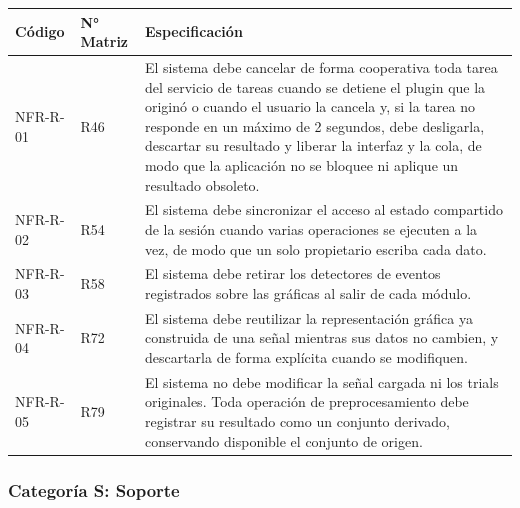 \documentclass[12pt, letterpaper]{article}
\begin{document}
\begin{longtable}{|p{2.5cm}|p{2.5cm}|p{10.1cm}|}
\hline
\rowcolor{gray!25}
\textbf{Código} & \textbf{N° Matriz} & \textbf{Especificación} \\
\hline
\endhead

\hline
\endlastfoot

NFR-R-01 & R46 & El sistema debe cancelar de forma cooperativa toda tarea del servicio de tareas cuando se detiene el plugin que la originó o cuando el usuario la cancela y, si la tarea no responde en un máximo de 2 segundos, debe desligarla, descartar su resultado y liberar la interfaz y la cola, de modo que la aplicación no se bloquee ni aplique un resultado obsoleto. \\
\hline
NFR-R-02 & R54 & El sistema debe sincronizar el acceso al estado compartido de la sesión cuando varias operaciones se ejecuten a la vez, de modo que un solo propietario escriba cada dato. \\
\hline
NFR-R-03 & R58 & El sistema debe retirar los detectores de eventos registrados sobre las gráficas al salir de cada módulo. \\
\hline
NFR-R-04 & R72 & El sistema debe reutilizar la representación gráfica ya construida de una señal mientras sus datos no cambien, y descartarla de forma explícita cuando se modifiquen. \\
\hline
NFR-R-05 & R79 & El sistema no debe modificar la señal cargada ni los trials originales. Toda operación de preprocesamiento debe registrar su resultado como un conjunto derivado, conservando disponible el conjunto de origen. \\

\end{longtable}
\vspace{-0.5em}
\label{tab:nfr-r}

\subsubsection{Categoría S: Soporte}
\end{document}
